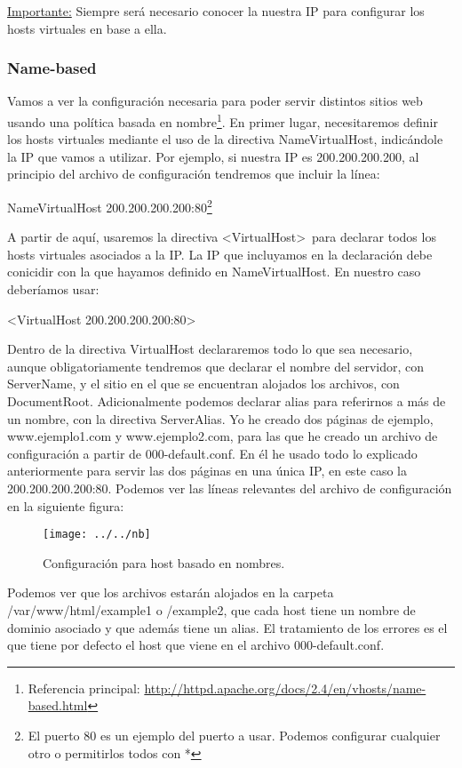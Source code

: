 \documentclass[a4paper, 10pt]{article} %
\begin{document}
\underline{Importante:} Siempre será necesario conocer la nuestra IP para configurar los hosts virtuales en base a ella. 

\subsubsection{Name-based}

Vamos a ver la configuración necesaria para poder servir distintos sitios web usando una política basada en nombre\footnote{Referencia principal: \url{http://httpd.apache.org/docs/2.4/en/vhosts/name-based.html}}. En primer lugar, necesitaremos definir los hosts virtuales mediante el uso de la directiva NameVirtualHost, indicándole la IP que vamos a utilizar. Por ejemplo, si nuestra IP es 200.200.200.200, al principio del archivo de configuración tendremos que incluir la línea:

NameVirtualHost 200.200.200.200:80\footnote{El puerto 80 es un ejemplo del puerto a usar. Podemos configurar cualquier otro o permitirlos todos con *}

A partir de aquí, usaremos la directiva <VirtualHost>\ para declarar todos los hosts virtuales asociados a la IP. La IP que incluyamos en la declaración debe conicidir con la que hayamos definido en NameVirtualHost. En nuestro caso deberíamos usar:

<VirtualHost 200.200.200.200:80>

Dentro de la directiva VirtualHost declararemos todo lo que sea necesario, aunque obligatoriamente tendremos que declarar el nombre del servidor, con ServerName, y el sitio en el que se encuentran alojados los archivos, con DocumentRoot. Adicionalmente podemos declarar alias para referirnos a más de un nombre, con la directiva ServerAlias. Yo he creado dos páginas de ejemplo, www.ejemplo1.com y www.ejemplo2.com, para las que he creado un archivo de configuración a partir de 000-default.conf. En él he usado todo lo explicado anteriormente para servir las dos páginas en una única IP, en este caso la 200.200.200.200:80. Podemos ver las líneas relevantes del archivo de configuración en la siguiente figura: 


\begin{figure}[htpb]
\centering
\texttt{[image: ../../nb]}
\caption{Configuración para host basado en nombres.}
\end{figure}

Podemos ver que los archivos estarán alojados en la carpeta /var/www/html/example1 o /example2, que cada host tiene un nombre de dominio asociado y que además tiene un alias. El tratamiento de los errores es el que tiene por defecto el host que viene en el archivo 000-default.conf.
\end{document}
